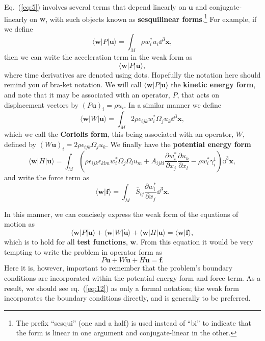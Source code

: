 Eq.~(\ref{eq:5}) involves several terms that depend linearly on $\mathbf{u}$ and conjugate-linearly on $\mathbf{w}$, with such objects known as 
 \textbf{sesquilinear forms}.\footnote{The prefix ``sesqui'' (one and a half) is used instead of ``bi'' to indicate that the form is linear in one argument and 
conjugate-linear in the other.} For example, if we define
\begin{equation}
\langle \mathbf{w}|P|\mathbf{u}\rangle=\int_{M}\rho w_{i}^{*}u_{i}\dd^{3}\mathbf{x},
\label{eq:6}
\end{equation}
then we can write the acceleration term in the weak form as
\begin{equation}
\langle \mathbf{w}|P|\ddot{\mathbf{u}}\rangle,
\label{eq:7}
\end{equation}
where time derivatives are denoted using dots. Hopefully the notation here should remind you of bra-ket notation. We will 
call $\langle \mathbf{w}|P|\mathbf{u}\rangle$ the \textbf{kinetic energy form}, and note that it may be associated with an operator, $P$, 
that acts on displacement vectors by $(P\mathbf{u})_{i}=\rho u_{i}$. In a similar manner we define
\begin{equation}
\langle \mathbf{w}|W|\mathbf{u}\rangle=\int_{M}2\rho\epsilon_{ijk}w_{i}^{*}\Omega_{j}u_{k}\dd^{3}\mathbf{x},
\label{eq:8}
\end{equation}
which we call the \textbf{Coriolis form}, this being associated with an operator, $W$, defined by $(W\mathbf{u})_{i}=2\rho\epsilon_{ijk}\Omega_{j}u_{k}$.
We finally have the \textbf{potential energy form}
\begin{equation}
\langle \mathbf{w}|H|\mathbf{u}\rangle=\int_{M}\left(\rho\epsilon_{ijk}\epsilon_{klm}w_{i}^{*}\Omega_{j}\Omega_{l}u_{m}+A_{ijkl}\frac{\partial w_{i}^{*}}{\partial x_{j}}\frac{\partial u_{k}}{\partial x_{l}}-\rho w_{i}^{*}\gamma_{i}^{1}\right)\dd^{3}\mathbf{x},
\label{eq:9}
\end{equation}
and write the force term as
\begin{equation}
\langle \mathbf{w}|\mathbf{f}\rangle=\int_{M}\overline{S}_{ij}\frac{\partial w_{i}^{*}}{\partial x_{j}}\dd^{3}\mathbf{x}.
\label{eq:10}
\end{equation}

In this manner, we can concisely express the weak form of the equations of motion as
\begin{equation}
\langle \mathbf{w}|P|\ddot{\mathbf{u}}\rangle+\langle \mathbf{w}|W|\dot{\mathbf{u}}\rangle+\langle \mathbf{w}|H|\mathbf{u}\rangle=\langle \mathbf{w}|\mathbf{f}\rangle,
\label{eq:11}
\end{equation}
which is to hold for all \textbf{test functions}, $\mathbf{w}$. From this equation it would be very tempting to write the problem in operator form as
\begin{equation}
P\ddot{\mathbf{u}}+W\dot{\mathbf{u}}+H\mathbf{u}=\mathbf{f}.
\label{eq:12}
\end{equation}
Here it is, however, important to remember that the problem's boundary conditions are incorporated within the potential energy form and force term. As a result, we should see eq.~(\ref{eq:12}) as only a formal notation; the weak form incorporates the boundary conditions directly, and is generally to be preferred.

